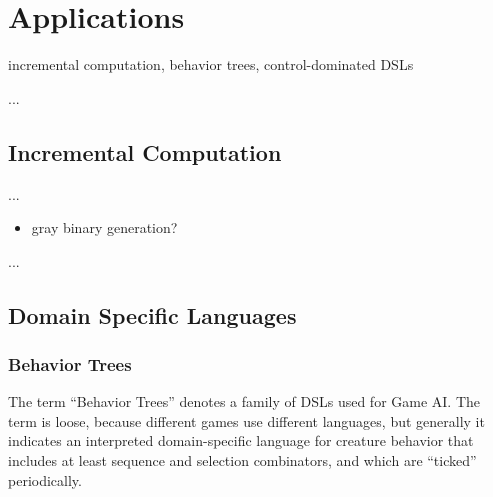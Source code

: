 \documentclass{acm_proc_article-sp}
\begin{document}
\begin{comment}
\begin{figure}%
\begin{lstlisting}[numbers=left,xleftmargin=3em]
class FoldL with
   pool List[]&   l;
   pool Action[]& actions;
   var  int&     acc;
do
   traverse e in l do
      if e:CONS then
         var Action*? a =
            spawn Action in actions with
               this.e    = e;
               action.acc = acc;
            end
         await *a;
      end
   end
end
\end{lstlisting}
\caption{
Calculating the \emph{sum} of a list.
\label{lst.sum}
}
\end{figure}
\end{comment}

\section{Applications}

incremental computation, behavior trees, control-dominated DSLs

...

\subsection{Incremental Computation}

...

\begin{itemize}
\item gray binary generation?
\end{itemize}

...

\subsection{Domain Specific Languages}

\subsubsection{Behavior Trees}

The term ``Behavior Trees'' denotes a family of DSLs 
used for Game AI.
The term is loose, because different games use different languages,
but generally it indicates an interpreted domain-specific language
for creature behavior that includes at least sequence and selection combinators,
and which are ``ticked'' periodically.
\end{document}
